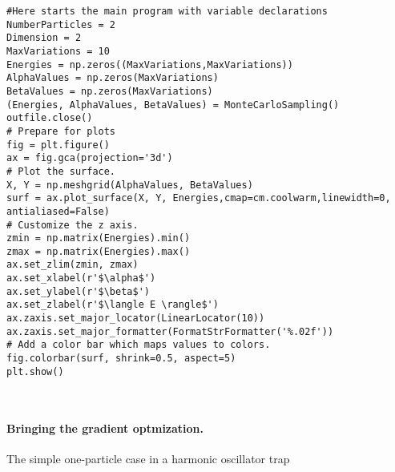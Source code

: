 \begin{verbatim}
#Here starts the main program with variable declarations
NumberParticles = 2
Dimension = 2
MaxVariations = 10
Energies = np.zeros((MaxVariations,MaxVariations))
AlphaValues = np.zeros(MaxVariations)
BetaValues = np.zeros(MaxVariations)
(Energies, AlphaValues, BetaValues) = MonteCarloSampling()
outfile.close()
# Prepare for plots
fig = plt.figure()
ax = fig.gca(projection='3d')
# Plot the surface.
X, Y = np.meshgrid(AlphaValues, BetaValues)
surf = ax.plot_surface(X, Y, Energies,cmap=cm.coolwarm,linewidth=0, antialiased=False)
# Customize the z axis.
zmin = np.matrix(Energies).min()
zmax = np.matrix(Energies).max()
ax.set_zlim(zmin, zmax)
ax.set_xlabel(r'$\alpha$')
ax.set_ylabel(r'$\beta$')
ax.set_zlabel(r'$\langle E \rangle$')
ax.zaxis.set_major_locator(LinearLocator(10))
ax.zaxis.set_major_formatter(FormatStrFormatter('%.02f'))
# Add a color bar which maps values to colors.
fig.colorbar(surf, shrink=0.5, aspect=5)
plt.show()



\end{verbatim}


\paragraph{Bringing the gradient optmization.}
The simple one-particle case in a harmonic oscillator trap


















